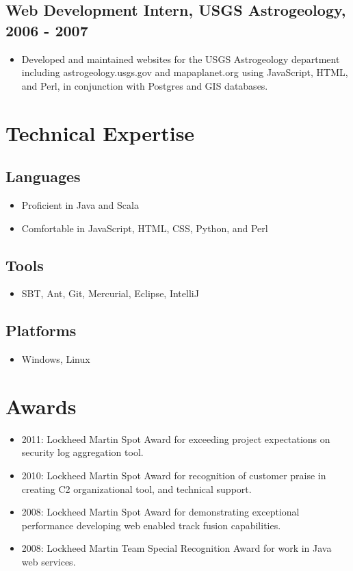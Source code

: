 \documentclass[11pt]{article}
\begin{document}
\subsection*{Web Development Intern, USGS Astrogeology, 2006 - 2007}
\label{sec-1.2}

\begin{itemize}
\item Developed and maintained websites for the USGS Astrogeology department including astrogeology.usgs.gov and mapaplanet.org using JavaScript, HTML, and Perl, in conjunction with Postgres and GIS databases.
\end{itemize}
\section*{Technical Expertise}
\label{sec-2}

\subsection*{Languages}
\label{sec-2.1}

\begin{itemize}
\item Proficient in Java and Scala
\item Comfortable in JavaScript, HTML, CSS, Python, and Perl
\end{itemize}
\subsection*{Tools}
\label{sec-2.2}

\begin{itemize}
\item SBT, Ant, Git, Mercurial, Eclipse, IntelliJ
\end{itemize}
\subsection*{Platforms}
\label{sec-2.3}

\begin{itemize}
\item Windows, Linux
\end{itemize}
\section*{Awards}
\label{sec-3}

\begin{itemize}
\item 2011: Lockheed Martin Spot Award for exceeding project expectations on security log aggregation tool.
\item 2010: Lockheed Martin Spot Award for recognition of customer praise in creating C2 organizational tool, and technical support.
\item 2008: Lockheed Martin Spot Award for demonstrating exceptional performance developing web enabled track fusion capabilities.
\item 2008: Lockheed Martin Team Special Recognition Award for work in Java web services.
\end{itemize}
\end{document}
